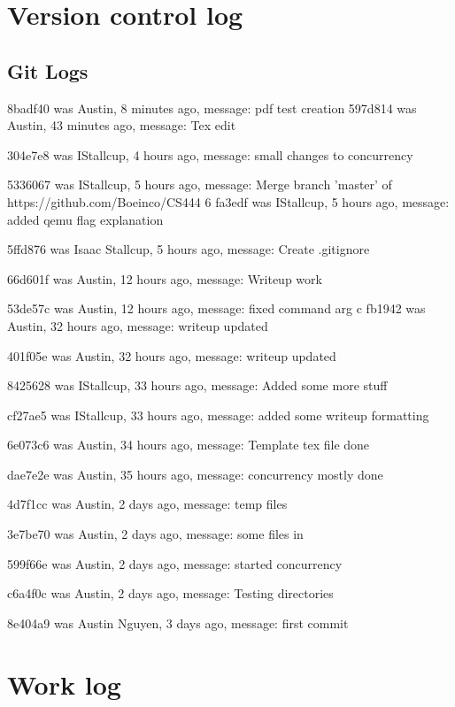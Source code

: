 \documentclass[letterpaper,10pt,titlepage]{article}
\begin{document}
\section{Version control log}
\begin{versionhistory}
\subsection{Git Logs}
8badf40 was Austin, 8 minutes ago, message: pdf test creation
597d814 was Austin, 43 minutes ago, message: Tex edit

304e7e8 was IStallcup, 4 hours ago, message: small changes to concurrency

5336067 was IStallcup, 5 hours ago, message: Merge branch 'master' of https://github.com/Boeinco/CS444
6
fa3edf was IStallcup, 5 hours ago, message: added qemu flag explanation

5ffd876 was Isaac Stallcup, 5 hours ago, message: Create .gitignore

66d601f was Austin, 12 hours ago, message: Writeup work

53de57c was Austin, 12 hours ago, message: fixed command arg
c
fb1942 was Austin, 32 hours ago, message: writeup updated

401f05e was Austin, 32 hours ago, message: writeup updated

8425628 was IStallcup, 33 hours ago, message: Added some more stuff

cf27ae5 was IStallcup, 33 hours ago, message: added some writeup formatting

6e073c6 was Austin, 34 hours ago, message: Template tex file done

dae7e2e was Austin, 35 hours ago, message: concurrency mostly done

4d7f1cc was Austin, 2 days ago, message: temp files

3e7be70 was Austin, 2 days ago, message: some files in

599f66e was Austin, 2 days ago, message: started concurrency

c6a4f0c was Austin, 2 days ago, message: Testing directories

8e404a9 was Austin Nguyen, 3 days ago, message: first commit

\end{versionhistory}

\section{Work log}
\end{document}
